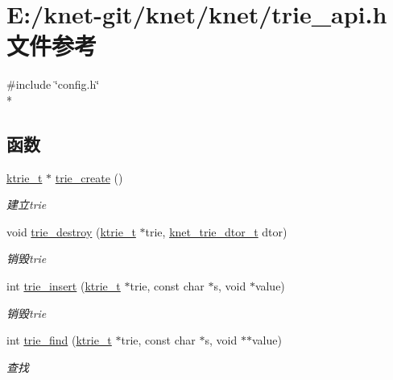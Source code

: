\hypertarget{a00106}{}\section{E\+:/knet-\/git/knet/knet/trie\+\_\+api.h 文件参考}
\label{a00106}
{\ttfamily \#include \char`\"{}config.\+h\char`\"{}}\\*
\subsection*{函数}
\begin{DoxyCompactItemize}
\item 
\hyperlink{a00056_a6b38314f31c4ed3eb36896383425a381_a6b38314f31c4ed3eb36896383425a381}{ktrie\+\_\+t} $\ast$ \hyperlink{a00123_ga40c34f3f3eed953a77e3df2927a24d0c_ga40c34f3f3eed953a77e3df2927a24d0c}{trie\+\_\+create} ()
\begin{DoxyCompactList}\small\item\em 建立trie \end{DoxyCompactList}\item 
void \hyperlink{a00123_ga1d3fcf14bbc77f4b3221ddb1121c21a0_ga1d3fcf14bbc77f4b3221ddb1121c21a0}{trie\+\_\+destroy} (\hyperlink{a00056_a6b38314f31c4ed3eb36896383425a381_a6b38314f31c4ed3eb36896383425a381}{ktrie\+\_\+t} $\ast$trie, \hyperlink{a00056_a46741b0dab7bbb26d611c429ee64d78c_a46741b0dab7bbb26d611c429ee64d78c}{knet\+\_\+trie\+\_\+dtor\+\_\+t} dtor)
\begin{DoxyCompactList}\small\item\em 销毁trie \end{DoxyCompactList}\item 
int \hyperlink{a00123_ga05e43d257d3626377de3340b6cd542fa_ga05e43d257d3626377de3340b6cd542fa}{trie\+\_\+insert} (\hyperlink{a00056_a6b38314f31c4ed3eb36896383425a381_a6b38314f31c4ed3eb36896383425a381}{ktrie\+\_\+t} $\ast$trie, const char $\ast$s, void $\ast$value)
\begin{DoxyCompactList}\small\item\em 销毁trie \end{DoxyCompactList}\item 
int \hyperlink{a00123_gae9c0f01c6b0eaf828710de2999601a11_gae9c0f01c6b0eaf828710de2999601a11}{trie\+\_\+find} (\hyperlink{a00056_a6b38314f31c4ed3eb36896383425a381_a6b38314f31c4ed3eb36896383425a381}{ktrie\+\_\+t} $\ast$trie, const char $\ast$s, void $\ast$$\ast$value)
\begin{DoxyCompactList}\small\item\em 查找 \end{DoxyCompactList}\item 
$$
\end{DoxyCompactItemize}
